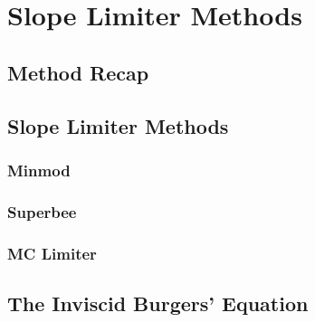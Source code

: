\chapter{Slope Limiter Methods}
\section{Method Recap}
\section{Slope Limiter Methods}
\subsection{Minmod}
\subsection{Superbee}
\subsection{MC Limiter}
\section{The Inviscid Burgers' Equation}
